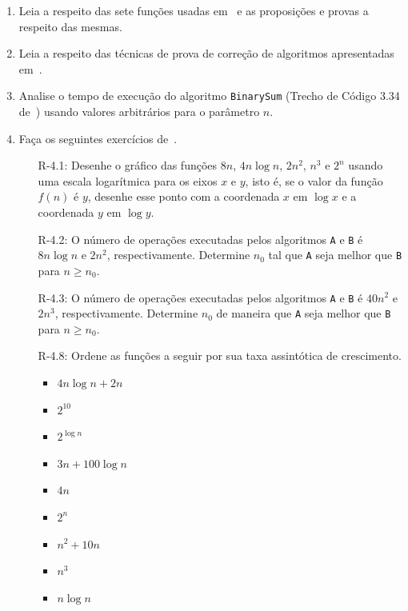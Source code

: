 \begin{enumerate}
	\item Leia a respeito das sete funções usadas em~\cite{GoodrichAndTamassia2013} e as proposições e provas a respeito das mesmas.
	
	\item Leia a respeito das técnicas de prova de correção de algoritmos apresentadas em~\cite{GoodrichAndTamassia2013}.
	
	\item Analise o tempo de execução do algoritmo \texttt{BinarySum} (Trecho de Código 3.34 de~\cite{GoodrichAndTamassia2013}) usando valores arbitrários para o parâmetro $n$.
	
	\bigskip
	
	\item Faça os seguintes exercícios de~\cite{GoodrichEtAl2014}.
	\begin{itemize}
		
		\item[R-4.1:] Desenhe o gráfico das funções $8n$, $4n \log n$, $2n^2$, $n^3$ e $2^n$ usando uma escala logarítmica para os eixos $x$ e $y$, isto é, se o valor da função $f(n)$ é $y$, desenhe esse ponto com a coordenada $x$ em $\log x$ e a coordenada $y$ em $\log y$.
		
		\item[R-4.2:] O número de operações executadas pelos algoritmos \texttt{A} e \texttt{B} é $8n \log n$ e $2n^2$, respectivamente. Determine $n_0$ tal que \texttt{A} seja melhor que \texttt{B} para $n \ge n_0$.
		
		\item[R-4.3:] O número de operações executadas pelos algoritmos \texttt{A} e \texttt{B} é $40n^2$ e $2n^3$, respectivamente. Determine $n_0$ de maneira que \texttt{A} seja melhor que \texttt{B} para $n \ge n_0$.
		
		\item[R-4.8:] Ordene as funções a seguir por sua taxa assintótica de crescimento.
		\begin{itemize}
			\item $4n \log n + 2n$
			\item $2^{10}$
			\item $2^{\log n}$
			\item $3n + 100 \log n$
			\item $4n$
			\item $2^n$
			\item $n^2 + 10n$
			\item $n^3$
			\item $n \log n$
		\end{itemize}
		

\end{itemize}
\end{enumerate}
